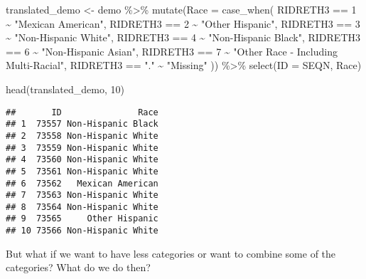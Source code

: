 \documentclass[
]{book}
\newenvironment{Shaded}{\begin{snugshade}}{\end{snugshade}}
\newcommand{\AttributeTok}[1]{\textcolor[rgb]{0.77,0.63,0.00}{#1}}
\newcommand{\DecValTok}[1]{\textcolor[rgb]{0.00,0.00,0.81}{#1}}
\newcommand{\FunctionTok}[1]{\textcolor[rgb]{0.00,0.00,0.00}{#1}}
\newcommand{\NormalTok}[1]{#1}
\newcommand{\OtherTok}[1]{\textcolor[rgb]{0.56,0.35,0.01}{#1}}
\newcommand{\SpecialCharTok}[1]{\textcolor[rgb]{0.00,0.00,0.00}{#1}}
\newcommand{\StringTok}[1]{\textcolor[rgb]{0.31,0.60,0.02}{#1}}
\begin{document}
\begin{Shaded}
\begin{Highlighting}[]
\NormalTok{translated\_demo }\OtherTok{\textless{}{-}}\NormalTok{ demo }\SpecialCharTok{\%\textgreater{}\%} 
    \FunctionTok{mutate}\NormalTok{(}\AttributeTok{Race =} \FunctionTok{case\_when}\NormalTok{(}
\NormalTok{          RIDRETH3 }\SpecialCharTok{==} \DecValTok{1} \SpecialCharTok{\textasciitilde{}} \StringTok{"Mexican American"}\NormalTok{,}
\NormalTok{          RIDRETH3 }\SpecialCharTok{==} \DecValTok{2} \SpecialCharTok{\textasciitilde{}} \StringTok{"Other Hispanic"}\NormalTok{,}
\NormalTok{          RIDRETH3 }\SpecialCharTok{==} \DecValTok{3} \SpecialCharTok{\textasciitilde{}} \StringTok{"Non{-}Hispanic White"}\NormalTok{,}
\NormalTok{          RIDRETH3 }\SpecialCharTok{==} \DecValTok{4} \SpecialCharTok{\textasciitilde{}} \StringTok{"Non{-}Hispanic Black"}\NormalTok{,}
\NormalTok{          RIDRETH3 }\SpecialCharTok{==} \DecValTok{6} \SpecialCharTok{\textasciitilde{}} \StringTok{"Non{-}Hispanic Asian"}\NormalTok{,}
\NormalTok{          RIDRETH3 }\SpecialCharTok{==} \DecValTok{7} \SpecialCharTok{\textasciitilde{}} \StringTok{"Other Race {-} Including Multi{-}Racial"}\NormalTok{,}
\NormalTok{          RIDRETH3 }\SpecialCharTok{==} \StringTok{"."} \SpecialCharTok{\textasciitilde{}} \StringTok{"Missing"}
\NormalTok{      )) }\SpecialCharTok{\%\textgreater{}\%}
    \FunctionTok{select}\NormalTok{(}\AttributeTok{ID =}\NormalTok{ SEQN, Race)}
\end{Highlighting}
\end{Shaded}

\begin{Shaded}
\begin{Highlighting}[]
\FunctionTok{head}\NormalTok{(translated\_demo, }\DecValTok{10}\NormalTok{)}
\end{Highlighting}
\end{Shaded}

\begin{verbatim}
##       ID               Race
## 1  73557 Non-Hispanic Black
## 2  73558 Non-Hispanic White
## 3  73559 Non-Hispanic White
## 4  73560 Non-Hispanic White
## 5  73561 Non-Hispanic White
## 6  73562   Mexican American
## 7  73563 Non-Hispanic White
## 8  73564 Non-Hispanic White
## 9  73565     Other Hispanic
## 10 73566 Non-Hispanic White
\end{verbatim}

But what if we want to have less categories or want to combine some of the categories? What do we do then?
\end{document}
